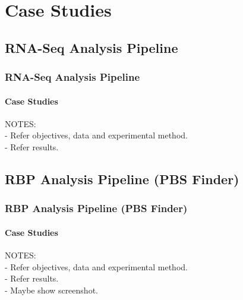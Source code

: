 \documentclass{beamer}
\begin{document}
\begin{frame}


\end{frame}


\section{Case Studies}
\subsection{RNA-Seq Analysis Pipeline}
\begin{frame}
  \frametitle{RNA-Seq Analysis Pipeline}
  \framesubtitle{Case Studies}

NOTES:\\
- Refer objectives, data and experimental method.\\
- Refer results.\\

\end{frame}

\subsection{RBP Analysis Pipeline (PBS Finder)}
\begin{frame}
  \frametitle{RBP Analysis Pipeline (PBS Finder)}
  \framesubtitle{Case Studies}

NOTES:\\
- Refer objectives, data and experimental method.\\
- Refer results.\\
- Maybe show screenshot.\\

\end{frame}
\end{document}

